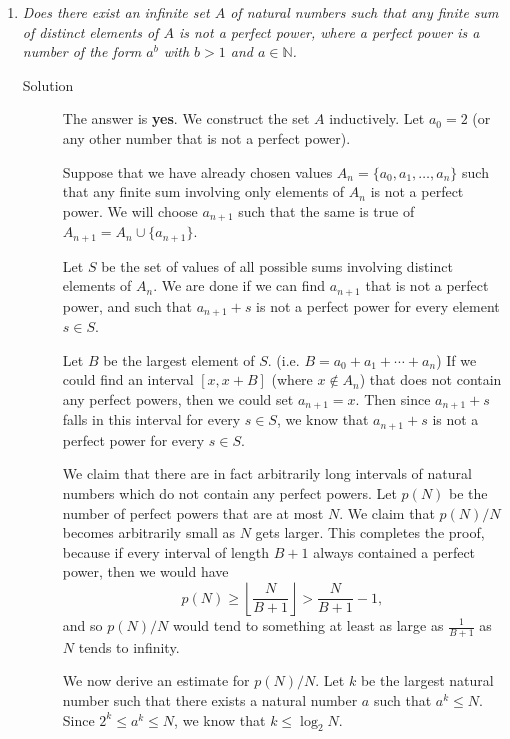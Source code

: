 \documentclass{article}
\begin{document}
\begin{enumerate}[1.]
\item %
{\itshape Does there exist an infinite set $A$ of natural numbers such that any finite sum of distinct elements of $A$ is not a perfect power, where a perfect power is a number of the form $a^b$ with $b > 1$ and $a \in \mathbb{N}$.}

\begin{description}
  \item[Solution]
    The answer is \textbf{yes}. We construct the set $A$ inductively. Let $a_0 = 2$ (or any other number that is not a perfect power).

    Suppose that we have already chosen values $A_n = \{a_0, a_1, \dots, a_n\}$ such that any finite sum involving only elements of $A_n$ is not a perfect power. We will choose $a_{n + 1}$ such that the same is true of $A_{n + 1} = A_n \cup \{ a_{n + 1} \}$.

    Let $S$ be the set of values of all possible sums involving distinct elements of $A_n$. We are done if we can find $a_{n + 1}$ that is not a perfect power, and such that $a_{n + 1} + s$ is not a perfect power for every element $s \in S$.

    Let $B$ be the largest element of $S$. (i.e. $B = a_0 + a_1 + \dotsb + a_n$) If we could find an interval $[x, x + B]$ (where $x \notin A_n$) that does not contain any perfect powers, then we could set $a_{n + 1} = x$. Then since $a_{n+1} + s$ falls in this interval for every $s \in S$, we know that $a_{n + 1} + s$ is not a perfect power for every $s \in S$.

    We claim that there are in fact arbitrarily long intervals of natural numbers which do not contain any perfect powers. Let $p(N)$ be the number of perfect powers that are at most $N$. We claim that $p(N)/N$ becomes arbitrarily small as $N$ gets larger. This completes the proof, because if every interval of length $B + 1$ always contained a perfect power, then we would have
    \[
      p(N) \geq \left\lfloor \frac{N}{B + 1} \right\rfloor > \frac{N}{B + 1} - 1,
    \]
    and so $p(N)/N$ would tend to something at least as large as $\frac{1}{B + 1}$ as $N$ tends to infinity.

    We now derive an estimate for $p(N)/N$. Let $k$ be the largest natural number such that there exists a natural number $a$ such that $a^k \leq N$. Since $2^k \leq a^k \leq N$, we know that $k \leq \log_2 N$.


\end{description}
\end{enumerate}
\end{document}
